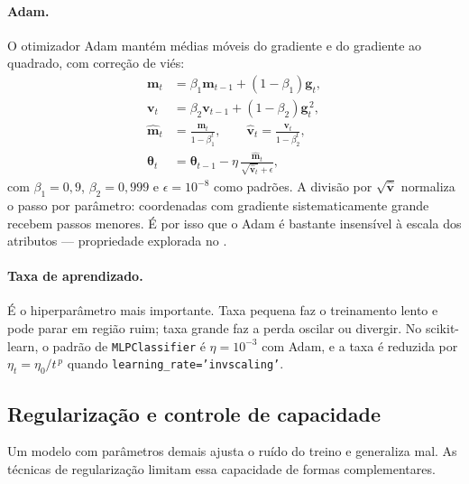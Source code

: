 \paragraph{Adam.} O otimizador Adam \cite{kingma2015} mantém médias móveis do gradiente e do
gradiente ao quadrado, com correção de viés:
\begin{align}
	\bm{m}_t &= \beta_1\bm{m}_{t-1} + (1-\beta_1)\bm{g}_t, \label{eq:adam-m}\\
	\bm{v}_t &= \beta_2\bm{v}_{t-1} + (1-\beta_2)\bm{g}_t^{\,2}, \label{eq:adam-v}\\
	\widehat{\bm{m}}_t &= \frac{\bm{m}_t}{1-\beta_1^{t}}, \qquad
	\widehat{\bm{v}}_t = \frac{\bm{v}_t}{1-\beta_2^{t}}, \label{eq:adam-bias}\\
	\bm{\theta}_t &= \bm{\theta}_{t-1} - \eta\,
	\frac{\widehat{\bm{m}}_t}{\sqrt{\widehat{\bm{v}}_t}+\epsilon},
	\label{eq:adam-upd}
\end{align}
com $\beta_1 = 0{,}9$, $\beta_2 = 0{,}999$ e $\epsilon = 10^{-8}$ como padrões. A divisão por
$\sqrt{\widehat{\bm{v}}}$ normaliza o passo por parâmetro: coordenadas com gradiente
sistematicamente grande recebem passos menores. É por isso que o Adam é bastante insensível à
escala dos atributos --- propriedade explorada no .

\paragraph{Taxa de aprendizado.} É o hiperparâmetro mais importante. Taxa pequena faz o
treinamento lento e pode parar em região ruim; taxa grande faz a perda oscilar ou divergir. No
scikit-learn, o padrão de \texttt{MLPClassifier} é $\eta = 10^{-3}$ com Adam, e a taxa é reduzida
por $\eta_t = \eta_0 / t^{\,p}$ quando \texttt{learning\_rate='invscaling'}.

\subsection{Regularização e controle de capacidade}
\label{sec:regularizacao}

Um modelo com parâmetros demais ajusta o ruído do treino e generaliza mal. As técnicas de
regularização limitam essa capacidade de formas complementares.

